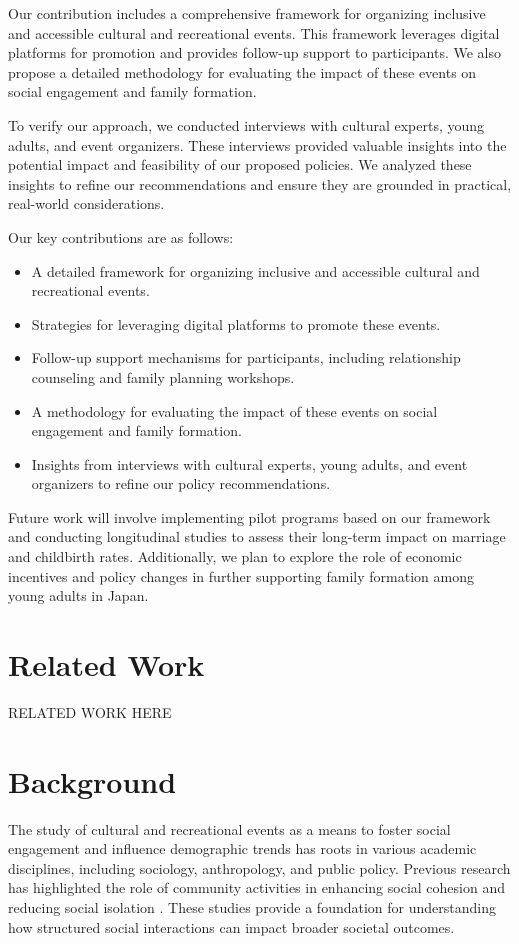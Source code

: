 \documentclass{article} %
\begin{document}
Our contribution includes a comprehensive framework for organizing inclusive and accessible cultural and recreational events. This framework leverages digital platforms for promotion and provides follow-up support to participants. We also propose a detailed methodology for evaluating the impact of these events on social engagement and family formation.

To verify our approach, we conducted interviews with cultural experts, young adults, and event organizers. These interviews provided valuable insights into the potential impact and feasibility of our proposed policies. We analyzed these insights to refine our recommendations and ensure they are grounded in practical, real-world considerations.

Our key contributions are as follows:
\begin{itemize}
    \item A detailed framework for organizing inclusive and accessible cultural and recreational events.
    \item Strategies for leveraging digital platforms to promote these events.
    \item Follow-up support mechanisms for participants, including relationship counseling and family planning workshops.
    \item A methodology for evaluating the impact of these events on social engagement and family formation.
    \item Insights from interviews with cultural experts, young adults, and event organizers to refine our policy recommendations.
\end{itemize}

Future work will involve implementing pilot programs based on our framework and conducting longitudinal studies to assess their long-term impact on marriage and childbirth rates. Additionally, we plan to explore the role of economic incentives and policy changes in further supporting family formation among young adults in Japan.

\section{Related Work}
\label{sec:related}
RELATED WORK HERE

\section{Background}
\label{sec:background}
The study of cultural and recreational events as a means to foster social engagement and influence demographic trends has roots in various academic disciplines, including sociology, anthropology, and public policy. Previous research has highlighted the role of community activities in enhancing social cohesion and reducing social isolation \citep{park2023generative, shanahan2023role}. These studies provide a foundation for understanding how structured social interactions can impact broader societal outcomes.
\end{document}
